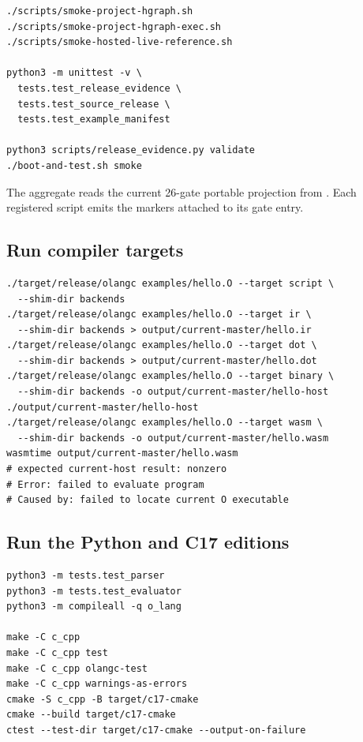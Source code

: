 \documentclass[11pt,oneside]{article}
\begin{document}
\begin{lstlisting}[style=plaincode]
./scripts/smoke-project-hgraph.sh
./scripts/smoke-project-hgraph-exec.sh
./scripts/smoke-hosted-live-reference.sh

python3 -m unittest -v \
  tests.test_release_evidence \
  tests.test_source_release \
  tests.test_example_manifest

python3 scripts/release_evidence.py validate
./boot-and-test.sh smoke
\end{lstlisting}

The aggregate reads the current 26-gate portable projection from
. Each registered script emits the markers attached
to its gate entry.

\subsection{Run compiler targets}

\begin{lstlisting}[style=plaincode]
./target/release/olangc examples/hello.O --target script \
  --shim-dir backends
./target/release/olangc examples/hello.O --target ir \
  --shim-dir backends > output/current-master/hello.ir
./target/release/olangc examples/hello.O --target dot \
  --shim-dir backends > output/current-master/hello.dot
./target/release/olangc examples/hello.O --target binary \
  --shim-dir backends -o output/current-master/hello-host
./output/current-master/hello-host
./target/release/olangc examples/hello.O --target wasm \
  --shim-dir backends -o output/current-master/hello.wasm
wasmtime output/current-master/hello.wasm
# expected current-host result: nonzero
# Error: failed to evaluate program
# Caused by: failed to locate current O executable
\end{lstlisting}

\subsection{Run the Python and C17 editions}

\begin{lstlisting}[style=plaincode]
python3 -m tests.test_parser
python3 -m tests.test_evaluator
python3 -m compileall -q o_lang

make -C c_cpp
make -C c_cpp test
make -C c_cpp olangc-test
make -C c_cpp warnings-as-errors
cmake -S c_cpp -B target/c17-cmake
cmake --build target/c17-cmake
ctest --test-dir target/c17-cmake --output-on-failure
\end{lstlisting}
\end{document}
